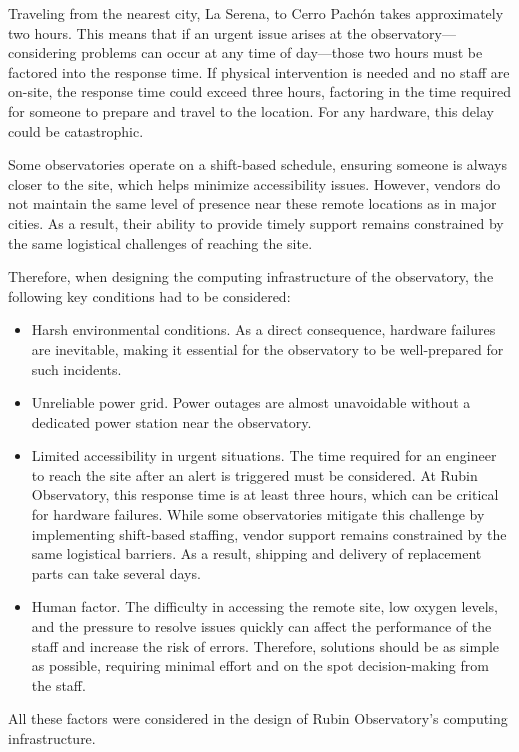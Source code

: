 Traveling from the nearest city, La Serena, to Cerro Pachón takes approximately two hours. This means that if an urgent issue arises at the observatory—considering problems can occur at any time of day—those two hours must be factored into the response time. If physical intervention is needed and no staff are on-site, the response time could exceed three hours, factoring in the time required for someone to prepare and travel to the location. For any hardware, this delay could be catastrophic. 

Some observatories operate on a shift-based schedule, ensuring someone is always closer to the site, which helps minimize accessibility issues. However, vendors do not maintain the same level of presence near these remote locations as in major cities. As a result, their ability to provide timely support remains constrained by the same logistical challenges of reaching the site.

Therefore, when designing the computing infrastructure of the observatory, the following key conditions had to be considered:

\begin {itemize}
\item Harsh environmental conditions. As a direct consequence, hardware failures are inevitable, making it essential for the observatory to be well-prepared for such incidents.
\item Unreliable power grid. Power outages are almost unavoidable without a dedicated power station near the observatory. 
\item Limited accessibility in urgent situations. The time required for an engineer to reach the site after an alert is triggered must be considered. At Rubin Observatory, this response time is at least three hours, which can be critical for hardware failures. While some observatories mitigate this challenge by implementing shift-based staffing, vendor support remains constrained by the same logistical barriers. As a result, shipping and delivery of replacement parts can take several days.
\item Human factor. The difficulty in accessing the remote site, low oxygen levels, and the pressure to resolve issues quickly can affect the performance of the staff and increase the risk of errors. Therefore, solutions should be as simple as possible, requiring minimal effort and on the spot decision-making from the staff.
\end {itemize}

All these factors were considered in the design of Rubin Observatory's computing infrastructure.


